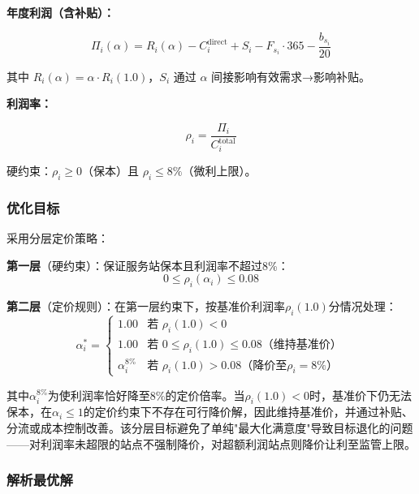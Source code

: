 \documentclass[UTF8]{ctexart}
\begin{document}
\textbf{年度利润（含补贴）：}

\begin{equation}
\Pi_i(\alpha) = R_i(\alpha) - C_i^{\text{direct}} + S_i - F_{s_i} \cdot 365 - \frac{b_{s_i}}{20} \tag{3.7}
\end{equation}

其中 $R_i(\alpha) = \alpha \cdot R_i(1.0)$，$S_i$ 通过 $\alpha$ 间接影响有效需求→影响补贴。

\textbf{利润率：}

\begin{equation}
\rho_i = \frac{\Pi_i}{C_i^{\text{total}}} \tag{3.8}
\end{equation}

硬约束：$\rho_i \geq 0$（保本）且 $\rho_i \leq 8\%$（微利上限）。

\subsubsection{优化目标}

采用分层定价策略：

\textbf{第一层}（硬约束）：保证服务站保本且利润率不超过8\%：
\begin{equation}
0 \leq \rho_i(\alpha_i) \leq 0.08 \tag{3.9a}
\end{equation}

\textbf{第二层}（定价规则）：在第一层约束下，按基准价利润率$\rho_i(1.0)$分情况处理：
\begin{equation}
\alpha_i^* = \begin{cases} 1.00 & \text{若 } \rho_i(1.0) < 0 \\ 1.00 & \text{若 } 0 \leq \rho_i(1.0) \leq 0.08 \text{（维持基准价）} \\ \alpha_i^{8\%} & \text{若 } \rho_i(1.0) > 0.08 \text{（降价至}\rho_i=8\%\text{）} \end{cases} \tag{3.9b}
\end{equation}

其中$\alpha_i^{8\%}$为使利润率恰好降至8\%的定价倍率。当$\rho_i(1.0)<0$时，基准价下仍无法保本，在$\alpha_i\leq 1$的定价约束下不存在可行降价解，因此维持基准价，并通过补贴、分流或成本控制改善。该分层目标避免了单纯"最大化满意度"导致目标退化的问题——对利润率未超限的站点不强制降价，对超额利润站点则降价让利至监管上限。

\subsubsection{解析最优解}
\end{document}
